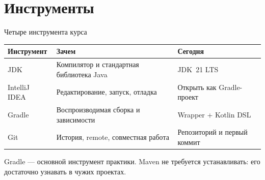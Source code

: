 \section{Инструменты}

\begin{frame}{Четыре инструмента курса}
  \sloppy
  \vspace{0.15em}
  \small
  \begin{tabular}{@{}p{}p{}p{}@{}}
    \toprule
    \textbf{Инструмент} & \textbf{Зачем} & \textbf{Сегодня}\\
    \midrule
    JDK
      & Компилятор и стандартная библиотека Java
      & JDK~21 LTS \\
    \addlinespace[0.3em]
    IntelliJ IDEA
      & Редактирование, запуск, отладка
      & Открыть как Gradle-проект \\
    \addlinespace[0.3em]
    Gradle
      & Воспроизводимая сборка и зависимости
      & Wrapper + Kotlin DSL \\
    \addlinespace[0.3em]
    Git
      & История, remote, совместная работа
      & Репозиторий и первый коммит \\
    \bottomrule
  \end{tabular}

  \vspace{0.8em}
  {\footnotesize\color{acGray}
  Gradle --- основной инструмент практики. Maven не требуется устанавливать:
  его достаточно узнавать в чужих проектах.}
\end{frame}
